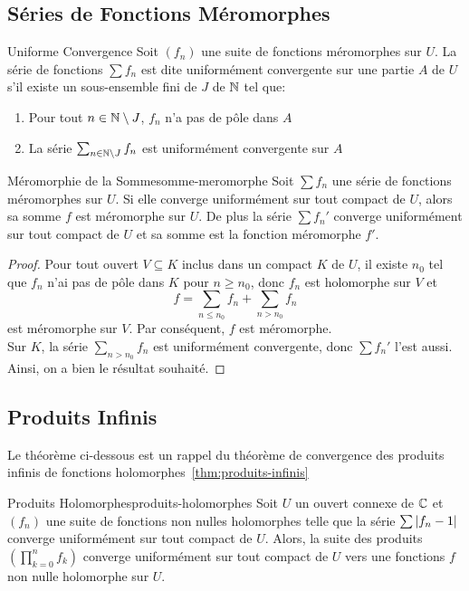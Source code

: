 \documentclass{cours}
\begin{document}
\subsection{Séries de Fonctions Méromorphes}
\begin{définition}
	{Uniforme Convergence}{}
	Soit $(f_{n})$ une suite de fonctions méromorphes sur $U$. La série de fonctions $\sum f_{n}$ est dite uniformément convergente sur une partie $A$ de $U$ s'il existe un sous-ensemble fini de $J$ de $\mathbb{N}$ tel que: 
	\begin{enumerate}
		\item Pour tout $n \in \mathbb{N} \setminus J$, $f_{n}$ n'a pas de pôle dans $A$
		\item La série $\sum_{n \in \mathbb{N} \setminus J} f_{n}$ est uniformément convergente sur $A$
	\end{enumerate}
\end{définition}

\begin{théorème}
	{Méromorphie de la Somme}{somme-meromorphe}
	Soit $\sum f_{n}$ une série de fonctions méromorphes sur $U$. 
	Si elle converge uniformément sur tout compact de $U$, alors sa somme $f$ est méromorphe sur $U$.
	De plus la série $\sum f_{n}'$ converge uniformément sur tout compact de $U$ et sa somme est la fonction méromorphe $f'$. 
\end{théorème}

\begin{proof}
	Pour tout ouvert $V \subseteq K$ inclus dans un compact $K$ de $U$, il existe $n_{0}$ tel que $f_{n}$ n'ai pas de pôle dans $K$ pour $n \geq n_{0}$, donc $f_{n}$ est holomorphe sur $V$ et 
	\[
		f = \sum_{n \leq n_{0}} f_{n} + \sum_{n > n_{0}} f_{n}
	\]
	est méromorphe sur $V$. Par conséquent, $f$ est méromorphe.\\
	Sur $K$, la série $\sum_{n > n_{0}} f_{n}$ est uniformément convergente, donc $\sum f_{n}'$ l'est aussi. 
	Ainsi, on a bien le résultat souhaité. 
\end{proof}

\subsection{Produits Infinis}
Le théorème ci-dessous est un rappel du théorème de convergence des produits infinis de fonctions holomorphes~\ref{thm:produits-infinis}
\begin{théorème}
	{Produits Holomorphes}{produits-holomorphes}
	Soit $U$ un ouvert connexe de $\mathbb{C}$ et $(f_{n})$ une suite de fonctions non nulles holomorphes telle que la série $\sum \left|f_{n} - 1\right|$ converge uniformément sur tout compact de $U$. Alors, la suite des produits $\left(\prod_{k = 0}^{n} f_{k}\right)$ converge uniformément sur tout compact de $U$ vers une fonctions $f$ non nulle holomorphe sur $U$. 
\end{théorème}
\end{document}

